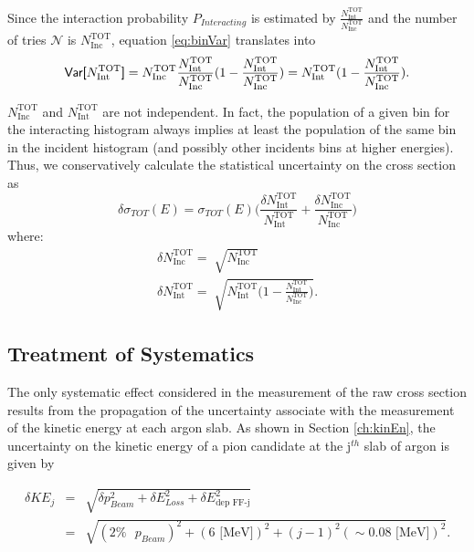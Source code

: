 Since the interaction probability $P_{Interacting}$ is estimated by $\frac{ N^{\text{TOT}}_{\text{Int}}}{N^{\text{TOT}}_{\text{Inc}}}$ and the number of tries $\mathcal{N}$ is $N^{\text{TOT}}_{\text{Inc}}$, equation \ref{eq:binVar} translates into
\begin{equation}
\text{\textsf{Var[}} N^{\text{TOT}}_{\text{Int}} \text{\textsf{]}}
= N^{\text{TOT}}_{\text{Inc}}\frac{ N^{\text{TOT}}_{\text{Int}}}{N^{\text{TOT}}_{\text{Inc}}} (1-\frac{ N^{\text{TOT}}_{\text{Int}}}{N^{\text{TOT}}_{\text{Inc}}}) = N^{\text{TOT}}_{\text{Int}}(1-\frac{ N^{\text{TOT}}_{\text{Int}}}{N^{\text{TOT}}_{\text{Inc}}}). 
\end{equation}

$N^{\text{TOT}}_{\text{Inc}}$ and $N^{\text{TOT}}_{\text{Int}}$ are not independent. In fact, the population of a given bin for the interacting histogram always implies at least the population of the same bin in the incident histogram  (and possibly other incidents bins at higher energies). Thus, we conservatively calculate the statistical uncertainty on the cross section as 
\begin{equation}
\delta\sigma_{TOT}(E) = \sigma_{TOT}(E) \Big(\frac{\delta N^{\text{TOT}}_{\text{Int}}}{N^{\text{TOT}}_{\text{Int}}}+\frac{\delta N^{\text{TOT}}_{\text{Inc}}}{N^{\text{TOT}}_{\text{Inc}}}\Big) 
\end{equation}
where:
\begin{eqnarray}
\delta N^{\text{TOT}}_{\text{Inc}} = \sqrt[]{N^{\text{TOT}}_{\text{Inc}}} \\
\delta N^{\text{TOT}}_{\text{Int}} = \sqrt[]{N^{\text{TOT}}_{\text{Int}}\Big(1-\frac{ N^{\text{TOT}}_{\text{Int}}}{N^{\text{TOT}}_{\text{Inc}}}\Big)}.
\end{eqnarray}



\subsection{Treatment of Systematics} \label{ch:SysUncertaintyXSRaw}
The only systematic effect considered in the measurement of the raw cross section results from the propagation of the uncertainty associate with the measurement of the kinetic energy at each argon slab. As shown in Section \ref{ch:kinEn}, the uncertainty on the kinetic energy of a pion candidate at the j$^{th}$ slab of argon  is given by

\begin{eqnarray}
\delta KE_{j} &=& \sqrt{\delta p_{Beam}^2 + \delta E_{Loss}^2 +  \delta  E_{\text{dep FF-j}}^2}\\
&=& \sqrt{(2\% \text{ }p_{Beam})^2 +  ( 6 \text{ [MeV]})^2 +  (j-1)^2 (\sim0.08\text{ [MeV]})^2}.
\end{eqnarray}

